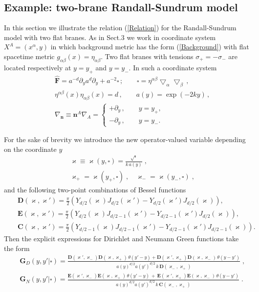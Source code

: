 \documentclass[a4paper,12pt]{article}
\newcommand{\za}{{\alpha}}   %
\newcommand{\zb}{{\beta}}    %
\newcommand{\ZA}{{A}}   %
\newcommand{\p}{{+}}
\newcommand{\n}{{-}}
\newcommand{\yp}{{y_{+}}}
\newcommand{\yn}{{y_{-}}}
\newcommand{\ddim}{{d}}
\newcommand{\un}{\mathbf n} %
\newcommand{\ddy}{{\partial_y}}
\newcommand{\bBox}{\square}  %
\newcommand{\BBox}{\hat{\mathbf{F}}}  %
\newcommand{\bnabla}{\bigtriangledown}  %
\newcommand{\Bnabla}{\nabla}  %
\newcommand{\Bnablan}{\nabla_{\un}}
\newcommand{\GrN}{ \mathbf{G}_{N}}  %
\newcommand{\GrD}{ \mathbf{G}_{D}}  %
\newcommand{\D}{\mathbf{D}}  %
\newcommand{\E}{\mathbf{E}}  %
\newcommand{\C}{\mathbf{C}}  %
\newcommand{\tens}{{\sigma}}
\begin{document}
\subsection{Example: two-brane Randall-Sundrum model}
\newcommand {\w}{\mathbf{\varkappa}}
\newcommand {\wpp}{\varkappa_\p}
\newcommand {\wnn}{\varkappa_\n}
\hspace{\parindent}In this section we illustrate the relation
(\ref{Relation}) for the Randall-Sundrum model with two flat
branes. As in Sect.3 we work in coordinate system
$X^\ZA=(x^\za,y)$ in which background metric has the form
(\ref{Background}) with flat spacetime metric
$g_{\alpha\beta}(x)=\eta_{\alpha\beta}$. Two  flat branes with
tensions $\tens_\p=-\tens_\n$ are located respectively at $y=\yp$
and $y=\yn$. In such a coordinate system
    \begin{eqnarray}
     &&\BBox=a^{-\ddim}\ddy a^{\ddim}\ddy +
     a^{-2}\bBox\,;\qquad \bBox
    =\eta^{\za\zb}\bnabla_{\za}\bnabla_{\zb}\,,\\
     &&\eta^{\za\zb}(x)\eta_{\za\zb}(x)
    =\ddim\,,\qquad a(y)=\exp(-
     2ky)\,,\nonumber\\
     &&\Bnablan \equiv\un^\ZA\Bnabla_\ZA=
     \left\{\begin{array}{l}
     +\ddy\,, \qquad y=\yp, \\
     -\ddy\,, \qquad y=\yn.
     \end{array}\right.               \label{RSQuantities}
    \end{eqnarray}

For the sake of brevity we introduce the new operator-valued
variable depending on the coordinate $y$
    \begin{eqnarray}
     &&\w\equiv\w(y,\bBox)
    =\frac{\sqrt{\bBox}}{k\,a(y)}\;,\nonumber\\
     &&\wpp=\w(\yp,\bBox)\;,
    \quad\wnn=\w(\yn,\bBox)\;,          \label{Def w}
    \end{eqnarray}
and the following two-point combinations of Bessel functions
    \begin{eqnarray}
     &&\D(\w,\w')=\frac{\pi}{2}\left(
      Y_{\ddim/2}(\w)J_{\ddim/2}(\w')-
      Y_{\ddim/2}(\w')J_{\ddim/2}(\w)\right),\nonumber\\
     &&\E(\w,\w')=\frac{\pi}{2}\left(
      Y_{\ddim/2}(\w)J_{\ddim/2-1}(\w')-
      Y_{\ddim/2-1}(\w')J_{\ddim/2}(\w)\right),\nonumber\\
     &&\C(\w,\w')=\frac{\pi}{2}\left(
      Y_{\ddim/2-1}(\w)J_{\ddim/2-1}(\w')-
      Y_{\ddim/2-1}(\w')
    J_{\ddim/2-1}(\w) \right).          \label{DefDEC}
    \end{eqnarray}
Then the explicit expressions for Dirichlet and Neumann Green
functions take the form \cite{BWEA}
    \begin{eqnarray}
     &&\GrD(y,y'|\bBox)=\frac{\D(\w',\wnn)\D(\w,\wpp)\,
    \theta(y'\!-\!y)
     +\D(\w',\wpp)\D(\w,\wnn)\,\theta(y\!-\!y')}
     {a(y)^{\ddim/2}a(y')^{\ddim/2}\,k\,\D(\wnn,\wpp)}\;,\\
     &&\GrN(y,y'|\bBox)=\frac{\E(\w',\wnn)\E(\w,\wpp)\,
    \theta(y'\!-\!y)
     \,+\,\E(\w',\wpp)\E(\w,\wnn)\,\theta(y\!-\!y')}
     {a(y)^{\ddim/2}a(y')^{\ddim/2}\,k\,
    \C(\wnn,\wpp)}\;.
     \end{eqnarray}
\end{document}
